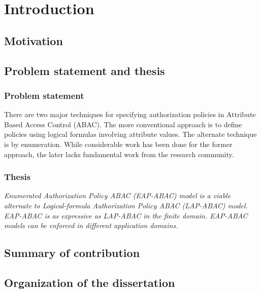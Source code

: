 \chapter{Introduction}






\section{Motivation}




\section{Problem statement and thesis}
\subsection{Problem statement}
There are two major techniques for specifying authorization policies in Attribute Based Access Control (ABAC). The more conventional approach is to define policies using logical formulas involving attribute values. The alternate technique is by enumeration. While considerable work has been done for the former approach, the later  lacks fundamental work from the research community.

\subsection{Thesis}
\textit{Enumerated Authorization Policy ABAC (EAP-ABAC) model is a viable alternate to Logical-formula Authorization Policy ABAC (LAP-ABAC) model. EAP-ABAC is as expressive as LAP-ABAC in the finite domain. EAP-ABAC models can be enforced in different application domains.}


\section{Summary of contribution}

\section{Organization of the dissertation}


